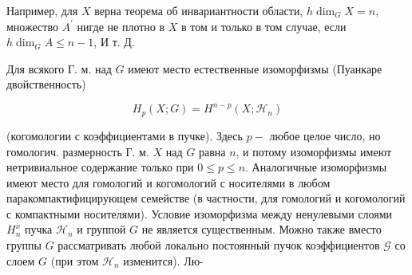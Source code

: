 \documentclass[10pt]{article}
\begin{document}
Например, для $X$ верна теорема об инвариантности области, $h \operatorname{dim}_{G} X=n$, множество $A^{\prime}$ нигде не плотно в $X$ в том и только в том случае, если $h \operatorname{dim}_{G} A \leqslant n-1$, И т. Д.



Для всякого Г. м. над $G$ имеют место естественные изоморфизмы (Пуанкаре двойственность)



\[

H_{p}(X ; G)=H^{n-p}\left(X ; \mathscr{H}_{n}\right)

\]



(когомологии с коэффициентами в пучке). Здесь $p-$ любое целое число, но гомологич. размерность Г. м. $X$ над $G$ равна $n$, и потому изоморфизмы имеют нетривиальное содержание только при $0 \leqslant p \leqslant n$. Аналогичные изоморфизмы имеют место для гомологий и когомологий с носителями в любом паракомпактифицирующем семействе (в частности, для гомологий и когомологий с компактными носителями). Условие изоморфизма между ненулевыми слоями $H_{n}^{x}$ пучка $\mathscr{H}_{n}$ и группой $G$ не является существенным. Можно также вместо группы $G$ рассматривать любой локально постоянный пучок коэффициентов $\mathscr{G}$ со слоем $G$ (при этом $\mathscr{H}_{n}$ изменится). Лю-
\end{document}
